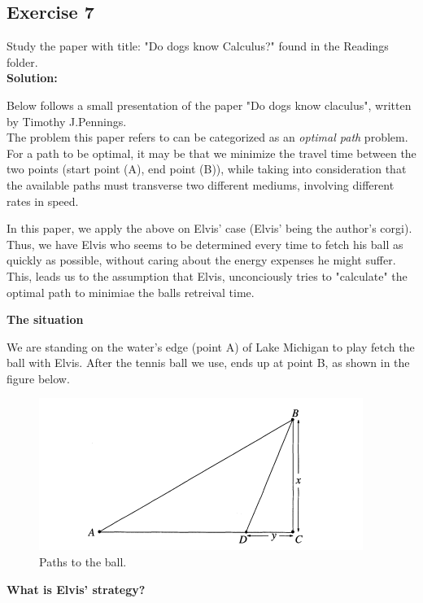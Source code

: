 \documentclass[12pt]{article}
\begin{document}
\subsection*{Exercise 7}
Study the paper with title: "Do dogs know Calculus?" found in the Readings folder.\\
\textbf{Solution:} \par
{Below follows a small presentation of the paper "Do dogs know claculus", written by Timothy J.Pennings.\\
The problem this paper refers to can be categorized as an \textit{optimal path} problem. For a path to be optimal, it may be that we minimize the travel time between the two points (start point (A), end point (B)), while taking into consideration that the available paths must transverse two different mediums, involving different rates in speed.\par 
In this paper, we apply the above on Elvis' case (Elvis' being the author's corgi). Thus, we have Elvis who seems to be determined every time to fetch his ball as quickly as possible, without caring about the energy expenses he might suffer. This, leads us to the assumption that Elvis, unconciously tries to "calculate" the optimal path to minimiae the balls retreival time.\par 
\begin{center}
\textbf{The situation}
\end{center}
We are standing on the water's edge (point A) of Lake Michigan to play fetch the ball with Elvis. After the tennis ball we use, ends up at point B, as shown in the figure below.
\begin{figure}[h!]
  \includegraphics[width=\linewidth]{pathsToTheBall.png}
  \caption{Paths to the ball.}
  \label{fig:path1}
\end{figure}
\begin{center}
\textbf{What is Elvis' strategy?}\\  

\end{center}}
\end{document}
